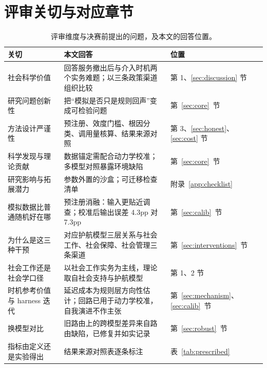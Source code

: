 \documentclass[10.5pt,twocolumn]{ctexart}
\begin{document}
\section{评审关切与对应章节}\label{app:review}
\begin{table}[H]
\centering\small
\caption{评审维度与决赛前提出的问题，及本文的回答位置。}
\label{tab:review}
\begin{tabular}{@{}p{}p{}p{}@{}}
\toprule
关切 & 本文回答 & 位置 \\
\midrule
社会科学价值 & 回答服务撤出后与介入时机两个实务难题；以三条政策渠道组织比较 & 第 1、\ref{sec:discussion} 节 \\
研究问题创新性 & 把``模拟是否只是规则回声''变成可检验问题 & 第~\ref{sec:core}~节 \\
方法设计严谨性 & 预注册、效度门槛、根因分类、调用量核算、结果来源对照 & 第 3、\ref{sec:honest}、\ref{sec:cost} 节 \\
科学发现与理论贡献 & 数据锚定需配合动力学校准；多模型对照暴露环境缺陷 & 第~\ref{sec:core}~节 \\
研究影响与拓展潜力 & 参数外置的沙盒；可迁移检查清单 & 附录~\ref{app:checklist} \\
\midrule
模拟数据比普通随机好在哪 & 预注册消融：输入更贴近调查；校准后输出误差 4.3pp 对 7.3pp & 第~\ref{sec:calib}~节 \\
为什么是这三种干预 & 对应护航模型三层关系与社会工作、社会保障、社会管理三条渠道 & 第~\ref{sec:interventions}~节 \\
社会工作还是社会学口径 & 以社会工作实务为主线，理论取自社会支持与护航模型 & 第 1、2 节 \\
时机参考价值与 harness 迭代 & 延迟成本为规则层方向性估计；回路已用于动力学校准，自我演进不作主张 & 第~\ref{sec:mechanism}、\ref{sec:calib}~节 \\
换模型对比 & 旧路由上的跨模型差异来自路由缺陷，已修复并如实记录 & 第~\ref{sec:robust}~节 \\
指标由定义还是实验得出 & 结果来源对照表逐条标注 & 表~\ref{tab:prescribed} \\
\bottomrule
\end{tabular}
\end{table}
\end{document}
